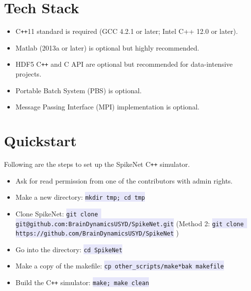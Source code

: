 \documentclass{article}
\newcommand{\mylstinline}[1] {\colorbox{Lavender}{\lstinline[basicstyle=\ttfamily\footnotesize\color{Black}]|#1|} }
\begin{document}
\section{Tech Stack}
\begin{itemize}
\item C\texttt{++}11 standard is required (GCC 4.2.1 or later; Intel C++ 12.0 or later).
\item Matlab (2013a or later) is optional but highly recommended.
\item HDF5 C\texttt{++} and C API are optional but recommended for data-intensive projects.
\item Portable Batch System (PBS) is optional.
\item Message Passing Interface (MPI) implementation is optional.
\end{itemize}
 
\section{Quickstart}
Following are the steps to set up the SpikeNet C\texttt{++} simulator.
\begin{itemize}
\item Ask for read permission from one of the contributors with admin rights.
\item Make a new directory: \mylstinline{mkdir tmp; cd tmp}
\item Clone SpikeNet: \mylstinline{git clone git@github.com:BrainDynamicsUSYD/SpikeNet.git}
\newline (Method 2: \mylstinline{git clone https://github.com/BrainDynamicsUSYD/SpikeNet})

\item Go into the directory: \mylstinline{cd SpikeNet}
\item Make a copy of the makefile: \mylstinline{cp other_scripts/make*bak makefile}
\item Build the C\texttt{++} simulator:  \mylstinline{make; make clean}
\end{itemize}
\end{document}
